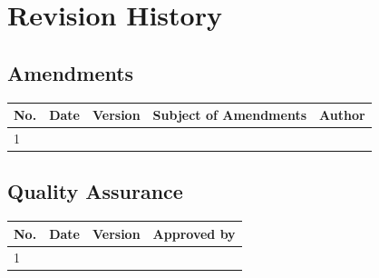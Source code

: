 \documentclass[a4paper]{arrowhead}
\begin{document}
\newpage




\newpage

\section{Revision History}
\subsection{Amendments}

\noindent\begin{tabularx}{\textwidth}{| p{1cm} | p{3cm} | p{2cm} | X | p{4cm} |} \hline
\rowcolor{gray!33} No. & Date & Version & Subject of Amendments & Author \\ \hline

1 & & & & \\ \hline

\end{tabularx}

\subsection{Quality Assurance}

\noindent\begin{tabularx}{\textwidth}{| p{1cm} | p{3cm} | p{2cm} | X |} \hline
\rowcolor{gray!33} No. & Date & Version & Approved by \\ \hline

1 & & & \\ \hline

\end{tabularx}
\end{document}
